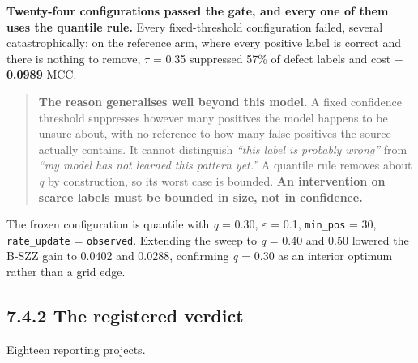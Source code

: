 \textbf{Twenty-four configurations passed the gate, and every one of
them uses the quantile rule.} Every fixed-threshold configuration
failed, several catastrophically: on the reference arm, where every
positive label is correct and there is nothing to remove, \ensuremath{\tau} = 0.35
suppressed 57\% of defect labels and cost \textbf{\ensuremath{-}0.0989} MCC.

\begin{quote}
\textbf{The reason generalises well beyond this model.} A fixed
confidence threshold suppresses however many positives the model happens
to be unsure about, with no reference to how many false positives the
source actually contains. It cannot distinguish \emph{``this label is
probably wrong''} from \emph{``my model has not learned this pattern
yet.''} A quantile rule removes about \emph{q} by construction, so its
worst case is bounded. \textbf{An intervention on scarce labels must be
bounded in size, not in confidence.}
\end{quote}

The frozen configuration is quantile with \emph{q} = 0.30, \ensuremath{\varepsilon} = 0.1,
\texttt{min\_pos} = 30, \texttt{rate\_update} = \texttt{observed}.
Extending the sweep to \emph{q} = 0.40 and 0.50 lowered the B-SZZ gain
to 0.0402 and 0.0288, confirming \emph{q} = 0.30 as an interior optimum
rather than a grid edge.

\subsection{7.4.2 The registered verdict}\label{the-registered-verdict}

Eighteen reporting projects.

